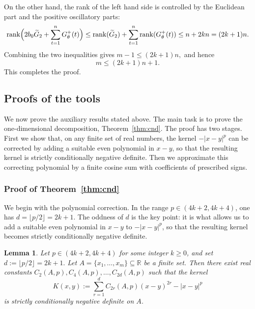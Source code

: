 \documentclass[11pt]{article}
\newtheorem{lemma}[theorem]{Lemma}
\theoremstyle{definition}
\begin{document}
On the other hand, the rank of the left hand side is controlled by the Euclidean part and the positive oscillatory parts:
\[
\operatorname{rank}\Bigl(2b_0\widetilde G_2+\sum_{t=1}^nG_\theta^+(t)\Bigr)
\le
\operatorname{rank}(\widetilde G_2)+\sum_{t=1}^n\operatorname{rank}(G_\theta^+(t))
\le n+2kn=(2k+1)n.
\]
Combining the two inequalities gives
\(
m-1\le (2k+1)n,
\)
and hence
\[
m\le (2k+1)n+1.
\]
This completes the proof.
















\subsection{Proofs of the tools}\label{subsec:proofs-tools}
We now prove the auxiliary results stated above. 
The main task is to prove the one-dimensional decomposition, Theorem~\ref{thm:cnd}. 
The proof has two stages. 
First we show that, on any finite set of real numbers, 
the kernel \(-|x-y|^p\) can be corrected by adding a suitable even polynomial in \(x-y\), 
so that the resulting kernel is strictly conditionally negative definite.
Then we approximate this correcting polynomial by a finite cosine sum with coefficients of prescribed signs.


\subsubsection{Proof of Theorem~\ref{thm:cnd}}
We begin with the polynomial correction. 
In the range \(p\in(4k+2,4k+4)\), one has \(d=\lfloor p/2\rfloor=2k+1\).
The oddness of \(d\) is the key point:
it is what allows us to add a suitable even polynomial in \(x-y\) to \(-|x-y|^p\), so that the resulting kernel becomes strictly conditionally negative definite.

\begin{lemma}\label{lem cnd}
Let \(p\in(4k+2,4k+4)\) for some integer \(k\ge0\), and set
\(
d:=\lfloor p/2\rfloor=2k+1.
\)
Let \(A=\{x_1,\dots,x_m\}\subseteq\mathbb R\) be a finite set. Then there exist real constants
\(
C_2(A,p),C_4(A,p),\dots,C_{2d}(A,p)
\)
such that the kernel
\[
K(x,y):=\sum_{r=1}^d C_{2r}(A,p)(x-y)^{2r}-|x-y|^p
\]
is strictly conditionally negative definite on \(A\).
\end{lemma}
\end{document}
